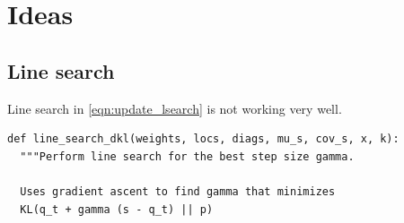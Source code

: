 \section{Ideas}
\subsection{Line search}
Line search in \ref{eqn:update_lsearch} is not working very well. 

\begin{verbatim}
def line_search_dkl(weights, locs, diags, mu_s, cov_s, x, k):
  """Perform line search for the best step size gamma.
  
  Uses gradient ascent to find gamma that minimizes
  KL(q_t + gamma (s - q_t) || p)
  

\end{verbatim}
